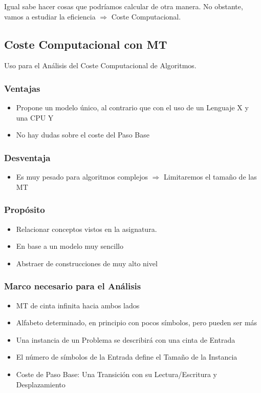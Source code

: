 Igual sabe hacer cosas que podríamos calcular de otra manera. No obstante, vamos a estudiar la eficiencia $\Rightarrow$ Coste Computacional.
\pagebreak

\subsection{Coste Computacional con MT}
Uso para el Análisis del Coste Computacional de Algoritmos.

\subsubsection{Ventajas}
\begin{itemize}
    \item Propone un modelo único, al contrario que con el uso de un Lenguaje X y una CPU Y
    \item No hay dudas sobre el coste del Paso Base
\end{itemize}

\subsubsection{Desventaja}
\begin{itemize}
    \item Es muy pesado para algoritmos complejos $\Rightarrow$ Limitaremos el tamaño de las MT
\end{itemize}

\subsubsection{Propósito}
\begin{itemize}
    \item Relacionar conceptos vistos en la asignatura.
    \item En base a un modelo muy sencillo
    \item Abstraer de construcciones de muy alto nivel
\end{itemize}

\subsubsection{Marco necesario para el Análisis}
\begin{itemize}
    \item MT de cinta infinita hacia ambos lados
    \item Alfabeto determinado, en principio con pocos símbolos, pero pueden ser más
    \item Una instancia de un Problema se describirá con una cinta de Entrada
    \item El número de símbolos de la Entrada define el Tamaño de la Instancia
    \item Coste de Paso Base: Una Transición con su Lectura/Escritura y Desplazamiento
\end{itemize}

